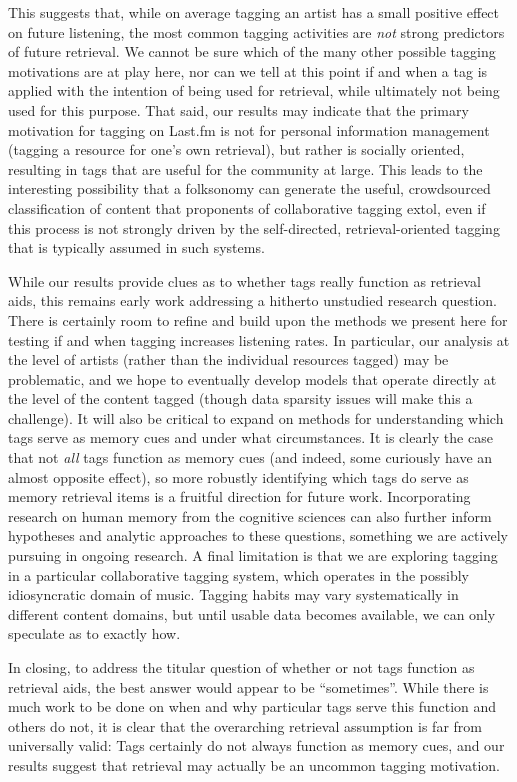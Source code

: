 This suggests that, while on average tagging an artist  has a small positive effect on future listening, the most common tagging activities are \emph{not} strong predictors of future retrieval. We cannot be sure which of the many other possible tagging motivations are at play here, nor can we tell at this point if and when a tag is applied with the intention of being used for retrieval, while ultimately not being used for this purpose. That said, our results may indicate that the primary motivation for tagging on Last.fm is not for personal information management (tagging a resource for one's own retrieval), but rather is socially oriented, resulting in tags that are useful for the community at large. This leads to the interesting possibility that a folksonomy can generate the useful, crowdsourced classification of content that proponents of collaborative tagging extol, even if this process is not strongly driven by the self-directed, retrieval-oriented tagging that is typically assumed in such systems.

While our results provide clues as to whether tags really function as retrieval aids, this remains early work addressing a hitherto unstudied research question. There is certainly room to refine and build upon the methods we present here for testing if and when tagging increases listening rates. In particular, our analysis at the level of artists (rather than the individual resources tagged) may be problematic, and we hope to eventually develop models that operate directly at the level of the content tagged (though data sparsity issues will make this a challenge). It will also be critical to expand on methods for understanding which tags serve as memory cues and under what circumstances. It is clearly the case that not \emph{all} tags function as memory cues (and indeed, some curiously have an almost opposite effect), so more robustly identifying which tags do serve as memory retrieval items is a fruitful direction for future work. Incorporating research on human memory from the cognitive sciences can also further inform hypotheses and analytic approaches to these questions, something we are actively pursuing in ongoing research. A final limitation is that we are exploring tagging in a particular collaborative tagging system, which operates in the possibly idiosyncratic domain of music. Tagging habits may vary systematically in different content domains, but until usable data becomes available, we can only speculate as to exactly how.

In closing, to address the titular question of whether or not tags function as retrieval aids, the best answer would appear to be ``sometimes''. While there is much work to be done on when and why particular tags serve this function and others do not, it is clear that the overarching retrieval assumption is far from universally valid: Tags certainly do not always function as memory cues, and our results suggest that retrieval may actually be an uncommon tagging motivation.

